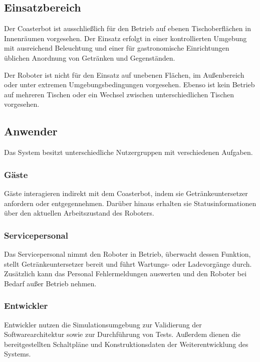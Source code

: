 \documentclass[
  a4paper,
  12pt,
  DIV=12,        %
  parskip=half,  %
  headings=small %
]{scrartcl}
\theoremstyle{definition}
\theoremstyle{definition}
\begin{document}
\subsection{Einsatzbereich}\label{einsatzbereich}

Der Coasterbot ist ausschließlich für den Betrieb auf ebenen
Tischoberflächen in Innenräumen vorgesehen. Der Einsatz erfolgt in einer
kontrollierten Umgebung mit ausreichend Beleuchtung und einer für
gastronomische Einrichtungen üblichen Anordnung von Getränken und
Gegenständen.

Der Roboter ist nicht für den Einsatz auf unebenen Flächen, im
Außenbereich oder unter extremen Umgebungsbedingungen vorgesehen. Ebenso
ist kein Betrieb auf mehreren Tischen oder ein Wechsel zwischen
unterschiedlichen Tischen vorgesehen.

\subsection{Anwender}\label{anwender}

Das System besitzt unterschiedliche Nutzergruppen mit verschiedenen
Aufgaben.

\subsubsection{Gäste}\label{guxe4ste}

Gäste interagieren indirekt mit dem Coasterbot, indem sie
Getränkeuntersetzer anfordern oder entgegennehmen. Darüber hinaus
erhalten sie Statusinformationen über den aktuellen Arbeitszustand des
Roboters.

\subsubsection{Servicepersonal}\label{servicepersonal}

Das Servicepersonal nimmt den Roboter in Betrieb, überwacht dessen
Funktion, stellt Getränkeuntersetzer bereit und führt Wartungs- oder
Ladevorgänge durch. Zusätzlich kann das Personal Fehlermeldungen
auswerten und den Roboter bei Bedarf außer Betrieb nehmen.

\subsubsection{Entwickler}\label{entwickler}

Entwickler nutzen die Simulationsumgebung zur Validierung der
Softwarearchitektur sowie zur Durchführung von Tests. Außerdem dienen
die bereitgestellten Schaltpläne und Konstruktionsdaten der
Weiterentwicklung des Systems.
\end{document}
